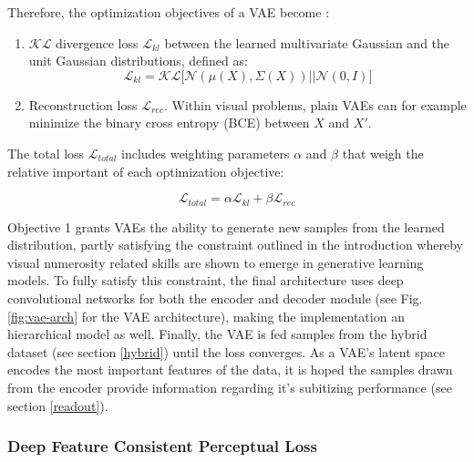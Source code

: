 \documentclass[twocolumn]{article}
\providecommand{\tightlist}{%
  \setlength{\itemsep}{0pt}\setlength{\parskip}{0pt}}
\begin{document}
\noindent Therefore, the optimization objectives of a VAE become \citep{doersch2016tutorial}:

\begin{enumerate}[topsep=2pt]
\def\labelenumi{\arabic{enumi}.}
\tightlist 
\item \(\mathcal{KL}\) divergence loss \(\mathcal{L}_{kl}\) between the learned multivariate Gaussian and the unit Gaussian distributions, defined as:
  \[\mathcal{L}_{kl} = \mathcal{KL}\lbrack\mathcal{N}(\mu(X), \Sigma(X)) \vert\vert \mathcal{N}(0, I)\rbrack\]
\item
 Reconstruction loss \(\mathcal{L}_{rec}\). Within visual problems, plain VAEs can for
  example minimize the binary cross entropy (BCE) between \(X\) and
  \(X'\).
\end{enumerate}

\noindent The total loss \(\mathcal{L}_{total}\) includes weighting parameters \(\alpha\) and \(\beta\) that weigh the relative important of each optimization objective:

\[\mathcal{L}_{total} = \alpha\mathcal{L}_{kl} + \beta\mathcal{L}_{rec} \tag{1}\]

\noindent Objective 1 grants VAEs the ability to generate new samples
from the learned distribution, partly satisfying the constraint outlined
in the introduction whereby visual numerosity related skills are shown to emerge in
generative learning models. To fully satisfy this constraint, the final
architecture uses deep convolutional networks for both the encoder and decoder
module (see Fig. \ref{fig:vae-arch} for the VAE architecture), making the
implementation an hierarchical model as well. Finally, the VAE is fed samples from the hybrid dataset (see section \ref{hybrid}) until the loss converges. As a VAE's latent space
encodes the most important features of the data, it is hoped the samples
drawn from the encoder provide information regarding it's subitizing
performance (see section \ref{readout}). 

\hypertarget{deep-feature-consistent-perceptual-loss}{%
\subsubsection{Deep Feature Consistent Perceptual
Loss}\label{deep-feature-consistent-perceptual-loss}}
\end{document}
